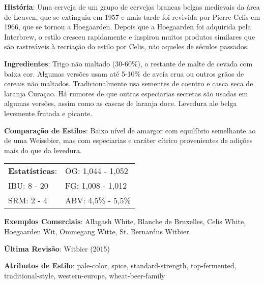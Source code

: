 \textbf{História}: Uma cerveja de um grupo de cervejas brancas belgas medievais da área de Leuven, que se extinguiu em 1957 e mais tarde foi revivida por Pierre Celis em 1966, que se tornou a Hoegaarden. Depois que a Hoegaarden foi adquirida pela Interbrew, o estilo cresceu rapidamente e inspirou muitos produtos similares que são rastreáveis à recriação do estilo por Celis, não aqueles de séculos passados.

\textbf{Ingredientes}: Trigo não maltado (30-60\%), o restante de malte de cevada com baixa cor. Algumas versões usam até 5-10\% de aveia crua ou outros grãos de cereais não maltados. Tradicionalmente usa sementes de coentro e casca seca de laranja Curaçao. Há rumores de que outras especiarias secretas são usadas em algumas versões, assim como as cascas de laranja doce. Levedura ale belga levemente frutada e picante.

\textbf{Comparação de Estilos}: Baixo nível de amargor com equilíbrio semelhante ao de uma Weissbier, mas com especiarias e caráter cítrico provenientes de adições mais do que da levedura.

\begin{tabular}{@{}p{35mm}p{35mm}@{}}
  \textbf{Estatísticas}: & OG: 1,044 - 1,052 \\
  IBU: 8 - 20  & FG: 1,008 - 1,012  \\
  SRM: 2 - 4  & ABV: 4,5\% - 5,5\%
\end{tabular}

\textbf{Exemplos Comerciais}: Allagash White, Blanche de Bruxelles, Celis White, Hoegaarden Wit, Ommegang Witte, St. Bernardus Witbier.

\textbf{Última Revisão}: Witbier (2015)

\textbf{Atributos de Estilo}: pale-color, spice, standard-strength, top-fermented, traditional-style, western-europe, wheat-beer-family
